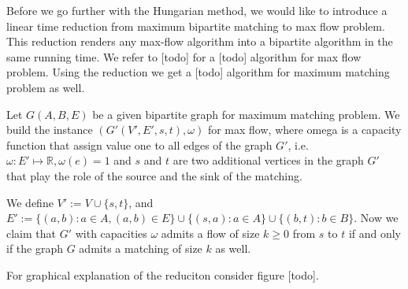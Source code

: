 Before we go further with the Hungarian method, we would like to introduce a linear time reduction from maximum bipartite matching to max flow problem. This reduction renders any max-flow algorithm into a bipartite algorithm in the same running time. We refer to [todo] for a [todo] algorithm for max flow problem. Using the reduction we get a [todo] algorithm for maximum matching problem as well.

\begin{reduction}
	Let $G(A, B, E)$ be a given bipartite graph for maximum matching problem. We build the instance $\left(G'(V', E', s, t), \omega\right)$ for max flow, where omega is a capacity function that assign value one to all edges of the graph $G'$, i.e. $\omega:E'\mapsto \mathbb{R}, \omega(e) = 1$ and $s$ and $t$ are two additional vertices in the graph $G'$ that play the role of the source and the sink of the matching.

	We define $V' := V \cup \{s, t\}$, and $E' := \{(a, b) : a \in A, (a, b) \in E\} \cup \{ (s, a): a \in A\} \cup \{(b, t): b \in B\}$.
	Now we claim that $G'$ with capacities $\omega$ admits a flow of size $k \geq 0$ from $s$ to $t$ if and only if the graph $G$ admits a matching of size $k$ as well.
\end{reduction}
For graphical explanation of the reduciton consider figure [todo].

